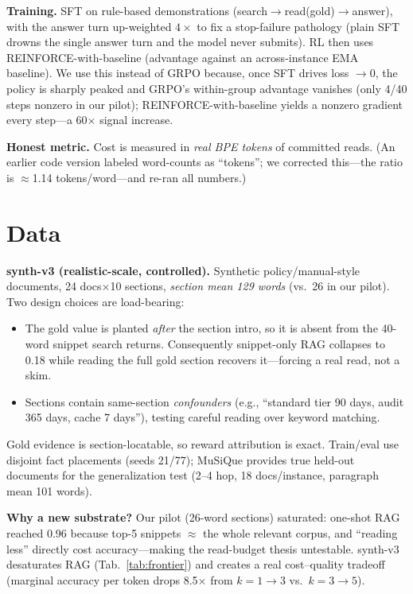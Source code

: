 \documentclass[10pt,twocolumn]{article}
\begin{document}
\textbf{Training.} SFT on rule-based demonstrations (search$\to$read(gold)$\to$answer), with the answer turn up-weighted $4\times$ to fix a stop-failure pathology (plain SFT drowns the single answer turn and the model never submits). RL then uses REINFORCE-with-baseline (advantage against an across-instance EMA baseline). We use this instead of GRPO because, once SFT drives loss $\to 0$, the policy is sharply peaked and GRPO's within-group advantage vanishes (only 4/40 steps nonzero in our pilot); REINFORCE-with-baseline yields a nonzero gradient every step---a 60$\times$ signal increase.

\textbf{Honest metric.} Cost is measured in \emph{real BPE tokens} of committed reads. (An earlier code version labeled word-counts as ``tokens''; we corrected this---the ratio is $\approx$1.14 tokens/word---and re-ran all numbers.)

\section{Data}
\label{sec:data}
\textbf{synth-v3 (realistic-scale, controlled).} Synthetic policy/manual-style documents, 24 docs$\times$10 sections, \emph{section mean 129 words} (vs.\ 26 in our pilot). Two design choices are load-bearing:
\begin{itemize}\itemsep0pt
\item The gold value is planted \emph{after} the section intro, so it is absent from the 40-word snippet search returns. Consequently snippet-only RAG collapses to 0.18 while reading the full gold section recovers it---forcing a real read, not a skim.
\item Sections contain same-section \emph{confounders} (e.g., ``standard tier 90 days, audit 365 days, cache 7 days''), testing careful reading over keyword matching.
\end{itemize}
Gold evidence is section-locatable, so reward attribution is exact. Train/eval use disjoint fact placements (seeds 21/77); MuSiQue provides true held-out documents for the generalization test (2--4 hop, 18 docs/instance, paragraph mean 101 words).

\textbf{Why a new substrate?} Our pilot (26-word sections) saturated: one-shot RAG reached 0.96 because top-5 snippets $\approx$ the whole relevant corpus, and ``reading less'' directly cost accuracy---making the read-budget thesis untestable. synth-v3 desaturates RAG (Tab.~\ref{tab:frontier}) and creates a real cost--quality tradeoff (marginal accuracy per token drops 8.5$\times$ from $k{=}1{\to}3$ vs.\ $k{=}3{\to}5$).
\end{document}

